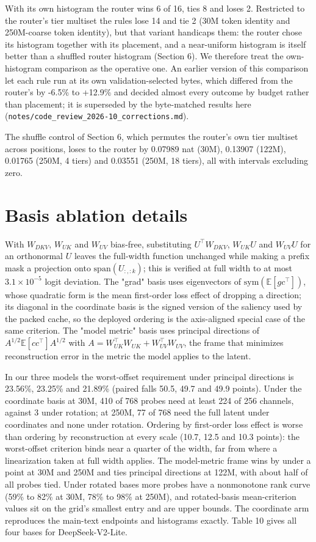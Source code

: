\documentclass[11pt]{article}
\begin{document}
With its own histogram the router wins 6 of 16, ties 8 and loses 2. Restricted to the router's tier multiset the rules lose 14 and tie 2 (30M token identity and 250M-coarse token identity), but that variant handicaps them: the router chose its histogram together with its placement, and a near-uniform histogram is itself better than a shuffled router histogram (Section 6). We therefore treat the own-histogram comparison as the operative one. An earlier version of this comparison let each rule run at its own validation-selected bytes, which differed from the router's by -6.5\% to +12.9\% and decided almost every outcome by budget rather than placement; it is superseded by the byte-matched results here (\texttt{notes/\allowbreak code\_review\_2026-10\_corrections.md}).

The shuffle control of Section 6, which permutes the router's own tier multiset across positions, loses to the router by 0.07989 nat (30M), 0.13907 (122M), 0.01765 (250M, 4 tiers) and 0.03551 (250M, 18 tiers), all with intervals excluding zero.

\section{Basis ablation details}

With $W_{DKV}$, $W_{UK}$ and $W_{UV}$ bias-free, substituting $U^\top W_{DKV}$, $W_{UK}U$ and $W_{UV}U$ for an orthonormal $U$ leaves the full-width function unchanged while making a prefix mask a projection onto $\mathrm{span}(U_{:,:k})$; this is verified at full width to at most $3.1\times10^{-5}$ logit deviation. The "grad" basis uses eigenvectors of $\mathrm{sym}(\mathbb E[gc^\top])$, whose quadratic form is the mean first-order loss effect of dropping a direction; its diagonal in the coordinate basis is the signed version of the saliency used by the packed cache, so the deployed ordering is the axis-aligned special case of the same criterion. The "model metric" basis uses principal directions of $A^{1/2}\mathbb E[cc^\top]A^{1/2}$ with $A=W_{UK}^\top W_{UK}+W_{UV}^\top W_{UV}$, the frame that minimizes reconstruction error in the metric the model applies to the latent.

In our three models the worst-offset requirement under principal directions is 23.56\%, 23.25\% and 21.89\% (paired falls 50.5, 49.7 and 49.9 points). Under the coordinate basis at 30M, 410 of 768 probes need at least 224 of 256 channels, against 3 under rotation; at 250M, 77 of 768 need the full latent under coordinates and none under rotation. Ordering by first-order loss effect is worse than ordering by reconstruction at every scale (10.7, 12.5 and 10.3 points): the worst-offset criterion binds near a quarter of the width, far from where a linearization taken at full width applies. The model-metric frame wins by under a point at 30M and 250M and ties principal directions at 122M, with about half of all probes tied. Under rotated bases more probes have a nonmonotone rank curve (59\% to 82\% at 30M, 78\% to 98\% at 250M), and rotated-basis mean-criterion values sit on the grid's smallest entry and are upper bounds. The coordinate arm reproduces the main-text endpoints and histograms exactly. Table 10 gives all four bases for DeepSeek-V2-Lite.
\end{document}
